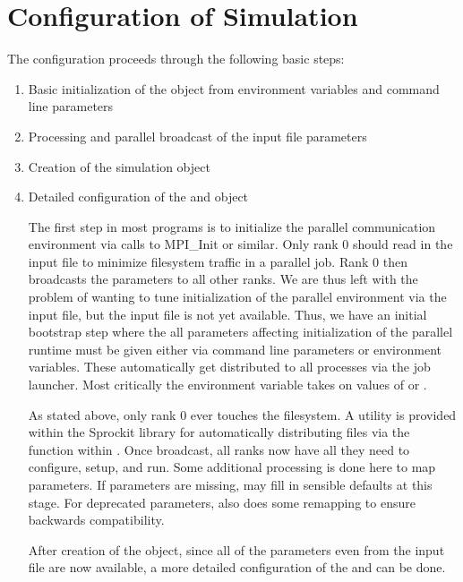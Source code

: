 \section{Configuration of Simulation}\label{sec:simConfig}
The configuration proceeds through the following basic steps:
\begin{enumerate}
\item Basic initialization of the  object from environment variables and command line parameters
\item Processing and parallel broadcast of the input file parameters
\item Creation of the simulation  object
\item Detailed configuration of the  and  object

The first step in most programs is to initialize the parallel communication environment via calls to MPI\_Init or similar.
Only rank 0 should read in the input file to minimize filesystem traffic in a parallel job.
Rank 0 then broadcasts the parameters to all other ranks.
We are thus left with the problem of wanting to tune initialization of the parallel environment via the input file,
but the input file is not yet available.
Thus, we have an initial bootstrap step where the all parameters affecting initialization of the parallel runtime must be given
either via command line parameters or environment variables.
These automatically get distributed to all processes via the job launcher.
Most critically the environment variable  takes on values of  or .

As stated above, only rank 0 ever touches the filesystem.
A utility is provided within the Sprockit library for automatically distributing files via the  function within .
Once broadcast, all ranks now have all they need to configure, setup, and run.
Some additional processing is done here to map parameters.
If parameters are missing, \sstmacro may fill in sensible defaults at this stage.
For deprecated parameters, \sstmacro also does some remapping to ensure backwards compatibility.

After creation of the  object, 
since all of the parameters even from the input file are now available,
a more detailed configuration of the  and  can be done.


\end{enumerate}
